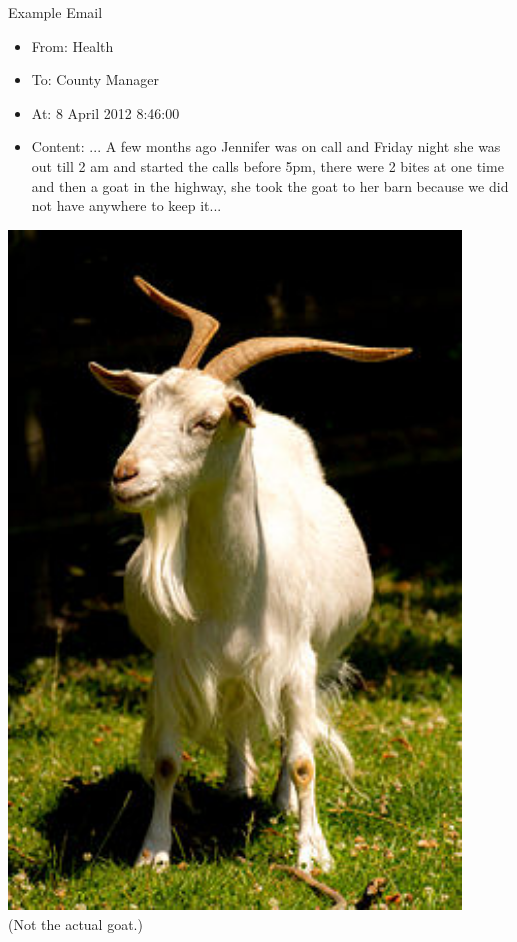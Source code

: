 \documentclass[10pt, xcolor=table]{beamer}
\theoremstyle{definition}
\theoremstyle{remark}
\begin{document}
\begin{frame}{Example Email}
  \begin{minipage}{0.7\linewidth}
\begin{itemize}
	\item From: Health\\
	\item To: County Manager\\
	\item At: 8 April 2012 8:46:00\\
	\item Content: ... A few months ago Jennifer was on call
          and Friday night she was out till 2 am and started the calls
          before 5pm, there were 2 bites at one time and then a goat
          in the highway, she took the goat to her barn because we did
          not have anywhere to keep it...
	\end{itemize}
\end{minipage}
  \begin{minipage}{0.25\linewidth}
\begin{center}
\includegraphics[width=0.90\textwidth]{figures/goat.jpg}\\
\tiny (Not the actual goat.)
\end{center}
\end{minipage}
\end{frame}
\end{document}
